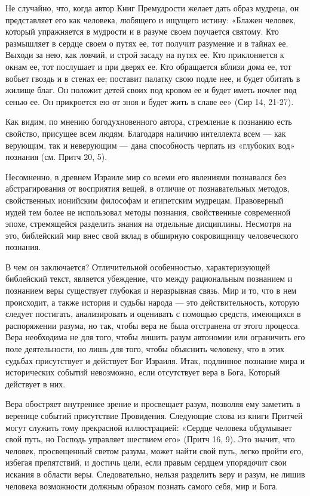 \documentclass[a5paper,10pt]{article}
\begin{document}
Не случайно, что, когда автор Книг Премудрости желает дать образ мудреца, он
представляет его как человека, любящего и ищущего истину: «Блажен человек,
который упражняется в мудрости и в разуме своем поучается святому. Кто
размышляет в сердце своем о путях ее, тот получит разумение и в тайнах ее.
Выходи за нею, как ловчий, и строй засаду на путях ее. Кто приклоняется к окнам
ее, тот послушает и при дверях ее. Кто обращается вблизи дома ее, тот вобьет
гвоздь и в стенах ее; поставит палатку свою подле нее, и будет обитать в жилище
благ. Он положит детей своих под кровом ее и будет иметь ночлег под сенью ее.
Он прикроется ею от зноя и будет жить в славе ее» (Сир 14, 21-27).

Как видим, по мнению богодухновенного автора, стремление к познанию есть
свойство, присущее всем людям. Благодаря наличию интеллекта всем — как
верующим, так и неверующим — дана способность черпать из «глубоких вод»
познания (см. Притч 20, 5).

Несомненно, в древнем Израиле мир со всеми его явлениями познавался без
абстрагирования от восприятия вещей, в отличие от познавательных методов,
свойственных ионийским философам и египетским мудрецам. Правоверный иудей тем
более не использовал методы познания, свойственные современной эпохе,
стремящейся разделить знания на отдельные дисциплины. Несмотря на это,
библейский мир внес свой вклад в обширную сокровищницу человеческого познания.

В чем он заключается? Отличительной особенностью, характеризующей библейский
текст, является убеждение, что между рациональным познанием и познанием веры
существует глубокая и неразрывная связь. Мир и то, что в нем происходит, а
также история и судьбы народа — это действительность, которую следует
постигать, анализировать и оценивать с помощью средств, имеющихся в
распоряжении разума, но так, чтобы вера не была отстранена от этого процесса.
Вера необходима не для того, чтобы лишить разум автономии или ограничить его
поле деятельности, но лишь для того, чтобы объяснить человеку, что в этих
судьбах присутствует и действует Бог Израиля. Итак, подлинное познание мира и
исторических событий невозможно, если отсутствует вера в Бога, Который
действует в них.

Вера обостряет внутреннее зрение и просвещает разум, позволяя ему заметить в
веренице событий присутствие Провидения. Следующие слова из книги Притчей могут
служить тому прекрасной иллюстрацией: «Сердце человека обдумывает свой путь, но
Господь управляет шествием его» (Притч 16, 9). Это значит, что человек,
просвещенный светом разума, может найти свой путь, легко пройти его, избегая
препятствий, и достичь цели, если правым сердцем упорядочит свои искания в
области веры. Следовательно, нельзя разделить веру и разум, не лишив человека
возможности должным образом познать самого себя, мир и Бога.
\end{document}
